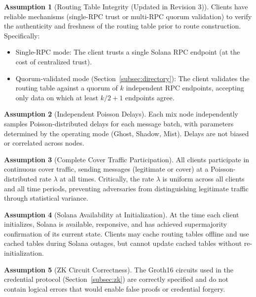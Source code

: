 \documentclass[11pt]{article}
\theoremstyle{definition}
\newtheorem{assumption}{Assumption}
\theoremstyle{remark}
\begin{document}
\begin{assumption}[Routing Table Integrity (Updated in Revision 3)]
\label{assum:rt-integrity}
Clients have reliable mechanisms (single-RPC trust or multi-RPC quorum validation) to verify the authenticity and freshness of the routing table prior to route construction. Specifically:
\begin{itemize}
    \item Single-RPC mode: The client trusts a single Solana RPC endpoint (at the cost of centralized trust).
    \item Quorum-validated mode (Section~\ref{subsec:directory}): The client validates the routing table against a quorum of $k$ independent RPC endpoints, accepting only data on which at least $k/2 + 1$ endpoints agree.
\end{itemize}
\end{assumption}

\begin{assumption}[Independent Poisson Delays]
\label{assum:poisson}
Each mix node independently samples Poisson-distributed delays for each message batch, with parameters determined by the operating mode (Ghost, Shadow, Mist). Delays are not biased or correlated across nodes.
\end{assumption}

\begin{assumption}[Complete Cover Traffic Participation]
\label{assum:cover-traffic}
All clients participate in continuous cover traffic, sending messages (legitimate or cover) at a Poisson-distributed rate $\lambda$ at all times. Critically, the rate $\lambda$ is uniform across all clients and all time periods, preventing adversaries from distinguishing legitimate traffic through statistical variance.
\end{assumption}

\begin{assumption}[Solana Availability at Initialization]
\label{assum:solana-init}
At the time each client initializes, Solana is available, responsive, and has achieved supermajority confirmation of its current state. Clients may cache routing tables offline and use cached tables during Solana outages, but cannot update cached tables without re-initialization.
\end{assumption}

\begin{assumption}[ZK Circuit Correctness]
\label{assum:zk-circuit}
The Groth16 circuits used in the credential protocol (Section~\ref{subsec:zk}) are correctly specified and do not contain logical errors that would enable false proofs or credential forgery.
\end{assumption}
\end{document}
